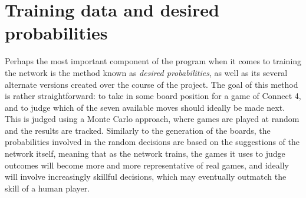 \documentclass[12pt]{article}
\begin{document}
\section{Training data and desired probabilities}
Perhaps the most important component of the program when it comes to training the network is the method known as \textit{desired probabilities}, as well as its several alternate versions created over the course of the project. The goal of this method is rather straightforward: to take in some board position for a game of Connect 4, and to judge which of the seven available moves should ideally be made next. This is judged using a Monte Carlo approach, where games are played at random and the results are tracked. Similarly to the generation of the boards, the probabilities involved in the random decisions are based on the suggestions of the network itself, meaning that as the network trains, the games it uses to judge outcomes will become more and more representative of real games, and ideally will involve increasingly skillful decisions, which may eventually outmatch the skill of a human player.
\end{document}
